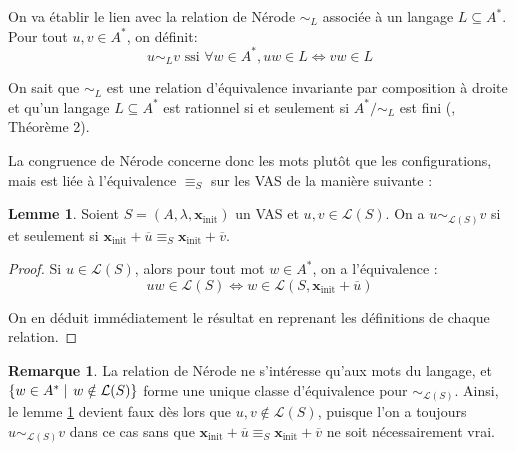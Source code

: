 \documentclass[a4paper,final]{article}
\theoremstyle{definition}
\newtheorem{Lemma}[Theorem]{Lemme}
\newtheorem*{Remark}{Remarque}
\newcommand{\alain}[1]{\textcolor{blue}{#1}}
\newcommand{\set}[2]{\left\{#1\mathrel{\left|\vphantom{#1}\vphantom{#2}\right.}#2\right\}}
\newcommand{\lang}{\ensuremath{\mathcal{L}}}
\newcommand{\vect}[1]{\ensuremath{\mathbf{#1}}}
\newcommand{\rel}{\ensuremath{\equiv}}
\newcommand{\ssi}{\ensuremath{\text{ ssi }}}
\newcommand{\equivaut}{\ensuremath{\Leftrightarrow}}
\newcommand{\xinit}{\ensuremath{\vect{x}_\text{init}}}
\newcommand{\valeur}[1]{\ensuremath{\overline{#1}}}
\begin{document}
On va établir le lien avec la relation de Nérode $\sim_L$ associée à un langage $L \subseteq A^*$. 
Pour tout $u,v\in A^\ast$, on définit: 
$$ u\sim_L v \ssi \forall w\in A^\ast, uw\in L \equivaut vw\in L $$


On sait que $\sim_L$ est une relation d'équivalence invariante par composition à droite et qu'un langage $L \subseteq A^*$ est rationnel si et seulement si $A^*/\sim_L$ est fini (\cite{rasc59}, Théorème 2).


La congruence de Nérode concerne donc les mots plutôt que les configurations, mais est liée à l'équivalence $ \rel_S$ sur les VAS de la manière suivante :

\begin{Lemma}\label{lien avec Nérode}
    Soient $S=(A,\lambda,\xinit)$ un VAS et $u,v\in\lang(S)$.
    On a $u\sim_{\lang(S)}v$ si et seulement si $\xinit +\valeur{u} \rel_S \xinit +\valeur{v}$.
\end{Lemma}

\begin{proof}
Si $u\in\lang(S)$, alors pour tout mot $w\in A^\ast$, on a l'équivalence :
$$uw\in\lang(S) \equivaut w\in\lang(S,\xinit +\valeur{u})$$

On en déduit immédiatement le résultat en reprenant les définitions de chaque relation.
\end{proof}


\begin{Remark}
La relation de Nérode ne s'intéresse qu'aux mots du langage, et $\set{w\in A^\ast}{w\notin\lang(S)}$ forme une unique classe d'équivalence pour $\sim_{\lang(S)}$.
Ainsi, le lemme \ref{lien avec Nérode} devient faux dès lors que $u,v\notin\lang(S)$, puisque l'on a toujours $u\sim_{\lang(S)}v$ dans ce cas sans que $\xinit +\valeur{u} \rel_S \xinit +\valeur{v}$ ne soit nécessairement vrai.
\end{Remark}
\end{document}
